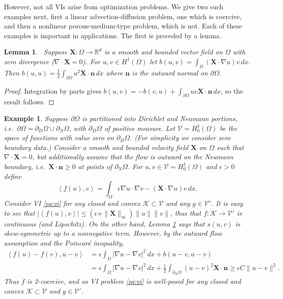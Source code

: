 \documentclass[letterpaper,final,12pt,reqno]{amsart}
\theoremstyle{cstyle}
\newtheorem{lemma}[theorem]{Lemma}
\theoremstyle{cstyle*}
\theoremstyle{dstyle}
\newtheorem{example}[theorem]{Example}
\numberwithin{equation}{section}
\numberwithin{figure}{section}
\numberwithin{table}{section}
\numberwithin{theorem}{section}
\newcommand{\eps}{\epsilon}
\newcommand{\RR}{\mathbb{R}}
\newcommand{\grad}{\nabla}
\newcommand{\Div}{\nabla\cdot}
\newcommand{\bn}{\mathbf{n}}
\newcommand{\bX}{\mathbf{X}}
\newcommand{\cK}{\mathcal{K}}
\newcommand{\cV}{\mathcal{V}}
\newcommand{\ip}[2]{\left<#1,#2\right>}
\begin{document}
However, not all VIs arise from optimization problems.  We give two such examples next, first a linear advection-diffusion problem, one which is coercive, and then a nonlinear porous-medium-type problem, which is not.  Each of these examples is important in applications.  The first is preceded by a lemma.

\begin{lemma}  \label{lem:advectionskew}  \cite{Elmanetal2014}\,  Suppose $\bX :\Omega \to \RR^d$ is a smooth and bounded vector field on $\Omega$ with zero divergence ($\Div \bX=0$).  For $u,v \in H^1(\Omega)$ let $b(u,v) = \int_\Omega (\bX \cdot \grad u) v\,dx$.  Then $b(u,u) = \frac{1}{2} \int_{\partial \Omega} u^2 \bX\cdot \bn\,dx$ where $\bn$ is the outward normal on $\partial \Omega$.
\end{lemma}

\begin{proof}
Integration by parts gives $b(u,v) = - b(v,u) + \int_{\partial \Omega} uv \bX\cdot \bn\,dx$, so the result follows.
\end{proof}

\begin{example}  \label{ex:advectiondiffusion}  Suppose $\partial\Omega$ is partitioned into Dirichlet and Neumann portions, i.e.~$\partial\Omega = \partial_D\Omega \cup \partial_N\Omega$, with $\partial_D\Omega$ of positive measure.  Let $\cV = H_0^1(\Omega)$ be the space of functions with value zero on $\partial_D\Omega$.  (For simplicity we consider zero boundary data.)  Consider a smooth and bounded velocity field $\bX$ on $\Omega$ such that $\Div \bX=0$, but additionally assume that the flow is outward on the Neumann boundary, i.e.~$\bX \cdot \bn \ge 0$ at points of $\partial_N\Omega$.  For $u,v \in \cV = H_0^1(\Omega)$ and $\eps>0$ define
\begin{equation}
\ip{f(u)}{v} = \int_\Omega \eps \grad u \cdot \grad v - (\bX \cdot \grad u) v\,dx. \label{eq:advectiondiffusion}
\end{equation}
Consider VI \eqref{eq:vi} for any closed and convex $\cK \subset \cV$ and any $g\in\cV'$.  It is easy to see that $|\ip{f(u)}{v}| \le (\eps + \|\bX\|_\infty) \|u\| \|v\|$, thus that $f:\cK \to \cV'$ is continuous (and Lipschitz).  On the other hand, Lemma \ref{lem:advectionskew} says that $s(u,v)$ is skew-symmetric up to a nonnegative term.  However, by the outward flow assumption and the Poincar\'e inequality,
\begin{align*}
\ip{f(u)-f(v)}{u-v} &= \eps \int_\Omega |\grad u - \grad v|^2\,dx + b(u-v,u-v) \\
                    &= \eps \int_\Omega |\grad u - \grad v|^2\,dx + \frac{1}{2} \int_{\partial_N\Omega} (u-v)^2 \bX\cdot\bn \ge \eps C \|u-v\|^2.
\end{align*}
Thus $f$ is 2-coercive, and so VI problem \eqref{eq:vi} is well-posed for any closed and convex $\cK \subset \cV$ and $g\in \cV'$.
\end{example}
\end{document}
